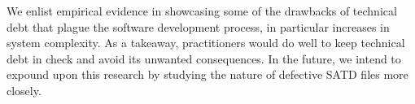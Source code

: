 We enlist empirical evidence in showcasing some of the drawbacks of technical debt that plague the software development process, in particular increases in system complexity. As a takeaway, practitioners would do well to keep technical debt in check and avoid its unwanted consequences. In the future, we intend to expound upon this research by studying the nature of defective SATD files more closely.
